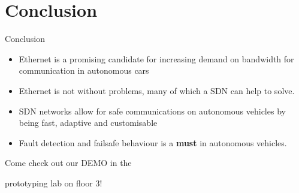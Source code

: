 \documentclass{beamer}
\begin{document}
\section{Conclusion}
\begin{frame}{Conclusion}
    \begin{itemize}
        \item Ethernet is a promising candidate for increasing demand on bandwidth for communication in autonomous cars
        \item Ethernet is not without problems, many of which a SDN can help to solve.
        \item SDN networks allow for safe communications on autonomous vehicles by being fast, adaptive and customisable
        \item Fault detection and failsafe behaviour is a \textbf{must} in autonomous vehicles.
    \end{itemize}

\end{frame}


\begin{frame}
    \Huge{\centerline{Come check out our DEMO in the}} 
    \Huge{\centerline{prototyping lab on floor 3!}} 
\end{frame}


        
\end{document}
